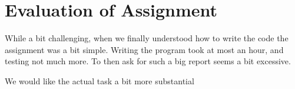 \section{Evaluation of Assignment}

While a bit challenging, when we finally understood how to write the code the assignment was a bit simple.
Writing the program took at most an hour, and testing not much more.
To then ask for such a big report seems a bit excessive.

We would like the actual task a bit more substantial
